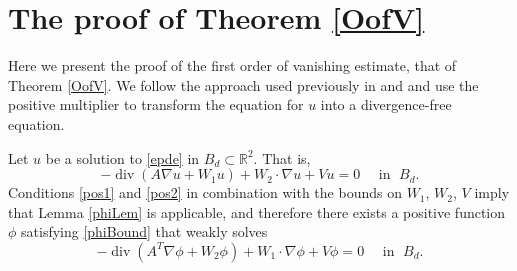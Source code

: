 \documentclass[12pt,reqno]{amsart}
\theoremstyle{plain}
\theoremstyle{definition}
\DeclareMathOperator{\di}{div}
\newcommand{\su}{\subset}
\newcommand{\gr}{\nabla}
\newcommand{\pr}[1]{\left( #1 \right) }
\newcommand{\R}{\ensuremath{\mathbb{R}}}
\begin{document}
\section{The proof of Theorem \ref{OofV}}
\label{S5}

Here we present the proof of the first order of vanishing estimate, that of Theorem \ref{OofV}.
We follow the approach used previously in \cite{KSW15} and \cite{DKW17} and use the positive multiplier to transform the equation for $u$ into a divergence-free equation.

Let $u$ be a solution to \eqref{epde} in $B_d \su \R^2$.
That is,
$$- \di\pr{A \gr u + W_1 u} + W_2 \cdot \gr u + V u = 0 \quad \text{ in } \; B_d.$$
Conditions \eqref{pos1} and \eqref{pos2} in combination with the bounds on $W_1$, $W_2$, $V$ imply that Lemma \ref{phiLem} is applicable, and therefore there exists a positive function $\phi$ satisfying \eqref{phiBound} that weakly solves
$$- \di\pr{A^T\gr \phi + W_2 \phi} + W_1 \cdot \gr \phi + V \phi = 0  \quad \text{ in } \; B_d.$$ 
\end{document}
